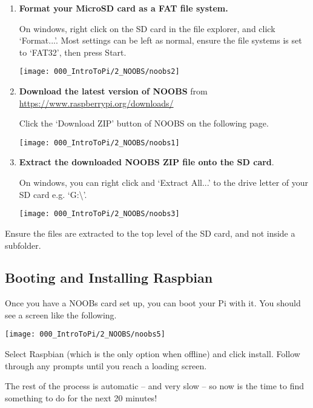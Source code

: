 	
		\begin{enumerate}[nosep]
			\item \textbf{Format your MicroSD card as a FAT file system.}
			
			On windows, right click on the SD card in the file explorer, and click `Format...'.	Most settings can be left as normal, ensure the file systems is set to `FAT32', then press Start.
			
			\begin{center}
				\texttt{[image: 000\_IntroToPi/2\_NOOBS/noobs2]}
			\end{center}
			
			\item \textbf{Download the latest version of NOOBS} from \url{https://www.raspberrypi.org/downloads/}
			
			Click the `Download ZIP' button of NOOBS on the following page.
			
			\begin{center}
				\texttt{[image: 000\_IntroToPi/2\_NOOBS/noobs1]}
			\end{center}
			
			\item \textbf{Extract the downloaded NOOBS ZIP file onto the SD card}.
			
			On windows, you can right click and `Extract All...' to the drive letter of your SD card e.g. `G:\textbackslash'.
			
			\begin{center}
				\texttt{[image: 000\_IntroToPi/2\_NOOBS/noobs3]}
			\end{center}
		\end{enumerate}
		
		Ensure the files are extracted to the top level of the SD card, and not inside a subfolder.
		
		\subsection{Booting and Installing Raspbian}
		
		Once you have a NOOBs card set up, you can boot your Pi with it. You should see a screen like the following.
		
		\begin{center}
			\texttt{[image: 000\_IntroToPi/2\_NOOBS/noobs5]}
		\end{center}
		
		Select Raspbian (which is the only option when offline) and click install. Follow through any prompts until you reach a loading screen.
		
		The rest of the process is automatic -- and very slow -- so now is the time to find something to do for the next 20 minutes!
		
		
	
